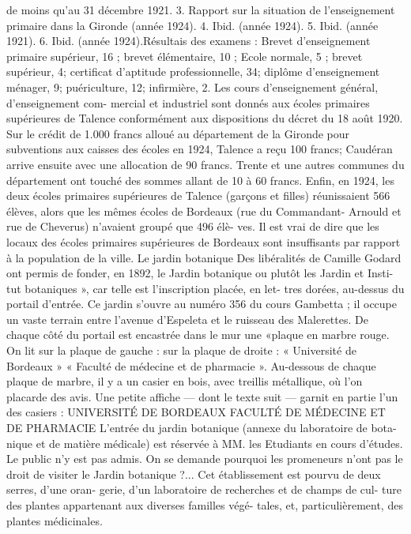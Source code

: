 \documentclass[a4paper,11pt]{book}
\begin{document}
de moins qu'au 31 décembre 1921.
3. Rapport sur la situation de l'enseignement primaire dans la Gironde
(année 1924).
4. Ibid. (année 1924).
5. Ibid. (année 1921).
6. Ibid. (année 1924).Résultais des examens : Brevet d'enseignement primaire
supérieur, 16 ; brevet élémentaire, 10 ; Ecole normale, 5 ;
brevet supérieur, 4; certificat d'aptitude professionnelle,
34; diplôme d'enseignement ménager, 9; puériculture, 12;
infirmière, 2.
Les cours d'enseignement général, d'enseignement com-
mercial et industriel sont donnés aux écoles primaires
supérieures de Talence conformément aux dispositions du
décret du 18 août 1920.
Sur le crédit de 1.000 francs alloué au département de
la Gironde pour subventions aux caisses des écoles en
1924, Talence a reçu 100 francs; Caudéran arrive ensuite
avec une allocation de 90 francs. Trente et une autres
communes du département ont touché des sommes allant
de 10 à 60 francs.
Enfin, en 1924, les deux écoles primaires supérieures de
Talence (garçons et filles) réunissaient 566 élèves, alors
que les mêmes écoles de Bordeaux (rue du Commandant-
Arnould et rue de Cheverus) n'avaient groupé que 496 élè-
ves. Il est vrai de dire que les locaux des écoles primaires
supérieures de Bordeaux sont insuffisants par rapport à
la population de la ville.
Le jardin botanique
Des libéralités de Camille Godard ont permis de fonder,
en 1892, le Jardin botanique ou plutôt les Jardin et Insti-
tut botaniques », car telle est l'inscription placée, en let-
tres dorées, au-dessus du portail d'entrée.
Ce jardin s'ouvre au numéro 356 du cours Gambetta ;
il occupe un vaste terrain entre l'avenue d'Espeleta et le
ruisseau des Malerettes.
De chaque côté du portail est encastrée dans le mur une
«plaque en marbre rouge. On lit sur la plaque de gauche :
sur la plaque de droite :
« Université de Bordeaux »
« Faculté de médecine et de pharmacie ».
Au-dessous de chaque plaque de marbre, il y a un casier
en bois, avec treillis métallique, où l'on placarde des avis.
Une petite affiche — dont le texte suit — garnit en partie
l'un des casiers :
UNIVERSITÉ DE BORDEAUX
FACULTÉ DE MÉDECINE ET DE PHARMACIE
L'entrée du jardin botanique (annexe du laboratoire de bota-
nique et de matière médicale) est réservée à MM. les Etudiants
en cours d'études.
Le public n'y est pas admis.
On se demande pourquoi les promeneurs n'ont pas le
droit de visiter le Jardin botanique ?...
Cet établissement est pourvu de deux serres, d'une oran-
gerie, d'un laboratoire de recherches et de champs de cul-
ture des plantes appartenant aux diverses familles végé-
tales, et, particulièrement, des plantes médicinales.
\end{document}
